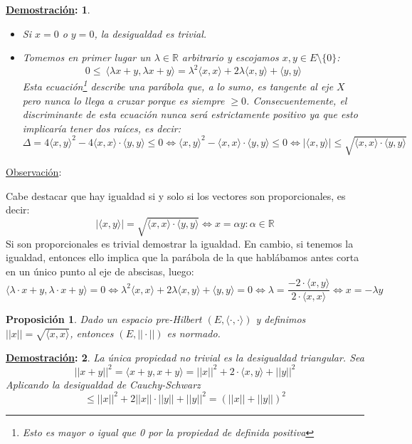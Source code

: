 \documentclass[10pt,a4paper,openright]{book}
\theoremstyle{break}
\newtheorem*{prop}{Proposición}
\newtheorem*{demo}{\underline{Demostración}:}
\begin{document}
\begin{demo}
\begin{itemize}
\item Si $x = 0$ o $y=0$, la desigualdad es trivial.

\item Tomemos en primer lugar un $\lambda\in \mathbb R$ arbitrario y escojamos $x,y \in E \setminus \{0\}$:
$$0 \leq \ \langle \lambda x + y, \lambda x + y\rangle = \lambda^2 \langle x,x\rangle + 2\lambda \langle x,y\rangle + \langle y,y\rangle$$
Esta ecuación\footnote{Esto es mayor o igual que 0 por la propiedad de definida positiva} describe una parábola que, a lo sumo, es tangente al eje $X$ pero nunca lo llega a cruzar porque es siempre $\geq 0$. Consecuentemente, el discriminante de esta ecuación nunca será estrictamente positivo ya que esto implicaría tener dos raíces, es decir:
$$\Delta = 4 \langle x,y\rangle^2 - 4\langle x,x\rangle\cdot \langle y,y\rangle \leq 0 \Leftrightarrow \langle x,y\rangle^2 -\langle x,x\rangle\cdot \langle y,y\rangle \leq 0 \Leftrightarrow|\langle x,y\rangle| \leq \sqrt{\langle x,x\rangle\cdot\langle y,y\rangle}$$
\end{itemize}
\end{demo}

\underline{Observación}:

Cabe destacar que hay igualdad si y solo si los vectores son proporcionales, es decir:
$$|\langle x,y\rangle| =\sqrt{\langle x,x\rangle \cdot \langle y,y\rangle} \Leftrightarrow x = \alpha y : \alpha \in \mathbb{R}$$
Si son proporcionales es trivial demostrar la igualdad. En cambio, si tenemos la igualdad, entonces ello implica que la parábola de la que hablábamos antes corta en un único punto al eje de abscisas, luego:
$$\langle\lambda \cdot x + y, \lambda \cdot x + y\rangle =  0\Leftrightarrow  \lambda^2 \langle x,x\rangle + 2\lambda \langle x,y\rangle + \langle y,y\rangle = 0 \Leftrightarrow \lambda = \frac{-2 \cdot \langle x,y\rangle}{2 \cdot \langle x,x\rangle} \Leftrightarrow x = -\lambda y$$

\begin{prop}
Dado un espacio pre-Hilbert $(E, \langle \cdot, \cdot \rangle)$ y definimos $||x|| = \sqrt{\langle x,x \rangle}$, entonces $(E, || \cdot ||)$ es normado.
\end{prop}

\begin{demo}
La única propiedad no trivial es la desigualdad triangular. Sea 
$$|| x+y||^2 = \langle x+y,x+y\rangle = ||x||^2 + 2 \cdot \langle x,y\rangle + ||y||^2$$
Aplicando la desigualdad de Cauchy-Schwarz
$$\leq ||x||^2 + 2 ||x|| \cdot ||y|| + ||y||^2 = (||x|| + ||y||)^2$$
\end{demo}
\end{document}
